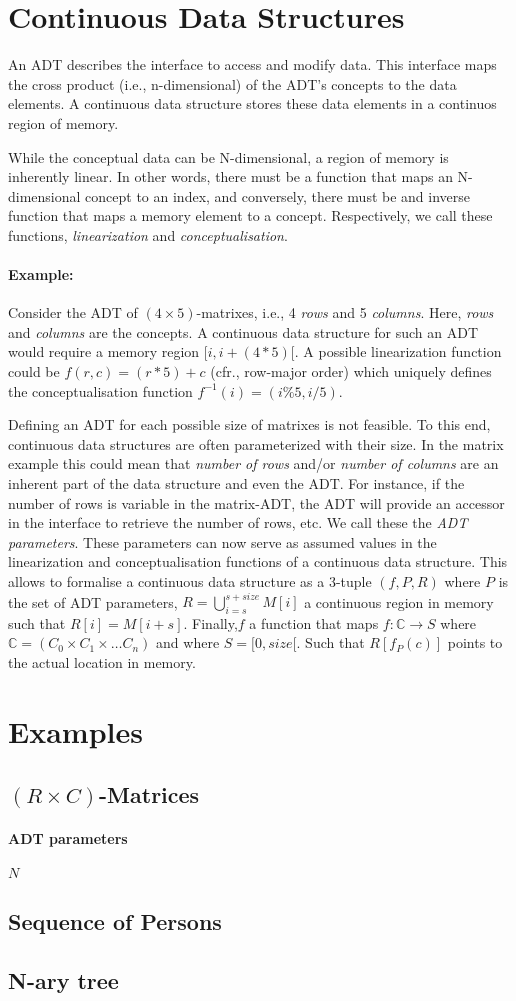 \documentclass[11pt]{amsart}
\begin{document}
\section{Continuous Data Structures}
An ADT describes the interface to access and modify data. This interface maps
the cross product (i.e., n-dimensional) of the ADT's concepts to the data
elements. A continuous data structure stores these data elements in a
continuos region of memory. 


While the
conceptual data can be N-dimensional, a region of memory is inherently linear.
In other words, there must be a function that maps an N-dimensional concept to
an index, and conversely, there must be and inverse function that maps a
memory element to a concept. Respectively, we call these functions,
\emph{linearization} and \emph{conceptualisation}. 

\paragraph{Example:} Consider the ADT of $(4\times 5)$-matrixes, i.e., 4
\emph{rows} and 5 \emph{columns}. Here, \emph{rows} and \emph{columns} are the
concepts. A continuous data structure for such an ADT would require a memory
region $[i,i+(4*5)[$. A possible linearization function could be $f(r,c)=
(r*5)+c$ (cfr., row-major order) which uniquely defines the conceptualisation
function $f^{-1}(i) = ( i\%5 , i/5 )$.

Defining an ADT for each possible size of matrixes is not feasible. To this
end, continuous data structures are often parameterized with their size. In
the matrix example this could mean that \emph{number of rows} and/or
\emph{number of columns} are an inherent part of the data structure and even
the ADT. For instance, if the number of rows is variable in the matrix-ADT,
the ADT will provide an accessor in the interface to retrieve the number of
rows, etc. We call these the \emph{ADT parameters}. These parameters can now
serve as assumed values in the linearization and conceptualisation functions
of a continuous data structure. This allows to formalise a continuous data
structure as a 3-tuple $(f,P,R)$ where $P$ is the set of ADT parameters, $R =
\bigcup_{i=s}^{s+size} M[i]$ a continuous region in memory such that
$R[i]=M[i+s]$. Finally,$f$ a function that maps $f: \mathbb{C} \to S$ where
$\mathbb{C}=(C_0 \times C_1 \times \dots C_n)$ and where $S=[0,size[$. Such
that $R[ f_P( c ) ]$ points to the actual location in memory.

\section{Examples}
\subsection{$(R \times C)$-Matrices}
\paragraph{ADT parameters} $N$

\subsection{Sequence of Persons}

\subsection{N-ary tree}
\end{document}

